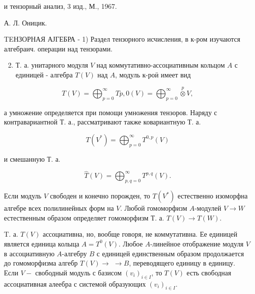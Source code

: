 \documentclass[10pt]{article}
\begin{document}
и тензорный анализ, 3 изд., М., 1967.

А. Л. Оницик.



TEНЗОРНАЯ АЈГЕБРА - 1) Раздел тензорного исчисления, в к-ром изучаются алгебраич. операции над тензорами.



\begin{enumerate}

  \setcounter{enumi}{1}

  \item Т. а. унитарного модуля $V$ над коммутативно-ассоциативным кольцом $A$ с единицей - алгебра $T(V)$ над $A$, модуль к-роӥ имеет вид

\end{enumerate}



\[

T(V)=\bigoplus_{p=0}^{\infty} T p, 0(V)=\bigoplus_{p=0}^{\infty} \stackrel{p}{\otimes} V,

\]



а умножение определяется при помощи умножения тензоров. Наряду с контравариантной Т. а., рассматривают также ковариантную Т. а.



\[

T\left(V^{*}\right)=\bigoplus_{p=0}^{\infty} T^{0, p}(V)

\]



и смешанную Т. а.



\[

\hat{T}(V)=\bigoplus_{p, q=0}^{\infty} T^{p, q}(V) .

\]



Если модуль $V$ свободен и конечно порожден, то $T\left(V^{*}\right)$ естественно изоморфна алгебре всех полилинейных форм на $V$. Любой гомоморфизм $A$-модулей $V \rightarrow W$ естественным образом определяет гомоморфизм Т. а. $T(V) \rightarrow T(W)$.



T. а. $T(V)$ ассоциативна, но, вообще говоря, не коммутативна. Ее единицей является единица колыца $A=T^{0}(V)$. Любое $A$-линейное отображение модуля $V$ в ассоциативную $A$-алгебру $B$ с единицей единственным образом продолжается до гомоморфизма алгебр $T(V) \rightarrow$ $\rightarrow B$, переводящего единицу в единицу. Если $V-$ свободный модуль с базисом $\left(v_{i}\right)_{i \in I}$, то $T(V)$ есть свободная ассоциативная алеебра с системой образующих $\left(v_{i}\right)_{i \in I}$.
\end{document}
